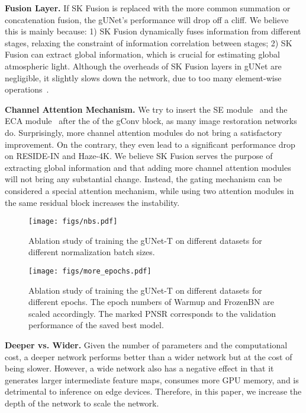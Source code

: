 \documentclass[10pt,twocolumn,letterpaper]{article}
\begin{document}
\noindent\textbf{Fusion Layer.}
If SK Fusion is replaced with the more common summation or concatenation fusion, the gUNet's performance will drop off a cliff.
We believe this is mainly because: 1) SK Fusion dynamically fuses information from different stages, relaxing the constraint of information correlation between stages; 2) SK Fusion can extract global information, which is crucial for estimating global atmospheric light.
Although the overheads of SK Fusion layers in gUNet are negligible, it slightly slows down the network, due to too many element-wise operations~\cite{ma2018shufflenet}.

\noindent\textbf{Channel Attention Mechanism.}
We try to insert the SE module~\cite{hu2018squeeze} and the ECA module~\cite{wang2020eca} after the  of the gConv block, as many image restoration networks~\cite{zhang2018image,anwar2019real,qin2020ffa} do.
Surprisingly, more channel attention modules do not bring a satisfactory improvement. 
On the contrary, they even lead to a significant performance drop on RESIDE-IN and Haze-4K.
We believe SK Fusion serves the purpose of extracting global information and that adding more channel attention modules will not bring any substantial change.
Instead, the gating mechanism can be considered a special attention mechanism, while using two attention modules in the same residual block increases the instability.

\begin{figure*}[t]
    \centering
    \texttt{[image: figs/nbs.pdf]}
    \caption{
        Ablation study of training the gUNet-T on different datasets for different normalization batch sizes.
    }
    \label{fig:nbs}
\end{figure*}

\begin{figure*}[t]
    \centering
    \texttt{[image: figs/more\_epochs.pdf]}
    \caption{
        Ablation study of training the gUNet-T on different datasets for different epochs.
        The epoch numbers of Warmup and FrozenBN are scaled accordingly.
        The marked PNSR corresponds to the validation performance of the saved best model.
    }
    \label{fig:epochs}
\end{figure*}

\noindent\textbf{Deeper vs. Wider.}
Given the number of parameters and the computational cost, a deeper network performs better than a wider network but at the cost of being slower.
However, a wide network also has a negative effect in that it generates larger intermediate feature maps, consumes more GPU memory, and is detrimental to inference on edge devices.
Therefore, in this paper, we increase the depth of the network to scale the network.
\end{document}
